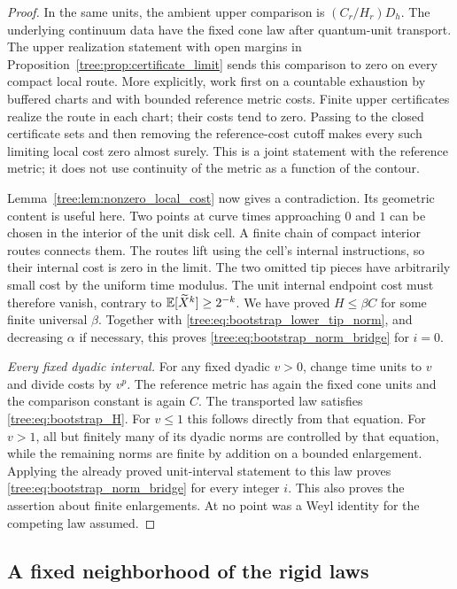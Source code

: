 \begin{proof}
In the same units, the ambient upper comparison is
$(C_r/H_r)D_h$.  The underlying continuum data have the fixed cone
law after quantum-unit transport.  The upper realization statement
with open margins in Proposition~\ref{tree:prop:certificate_limit} sends
this comparison to zero on every compact local route.  More
explicitly, work first on a countable exhaustion by buffered charts
and with bounded reference metric costs.  Finite upper certificates
realize the route in each chart; their costs tend to zero.  Passing
to the closed certificate sets and then removing the reference-cost
cutoff makes every such limiting local cost zero almost surely.
This is a joint statement with the reference metric; it does not
use continuity of the metric as a function of the contour.

Lemma~\ref{tree:lem:nonzero_local_cost} now gives a contradiction.  Its
geometric content is useful here.  Two points at curve times
approaching $0$ and $1$ can be chosen in the interior of the unit
disk cell.  A finite chain of compact interior routes connects them.
The routes lift using the cell's internal instructions, so their
internal cost is zero in the limit.  The two omitted tip pieces
have arbitrarily small cost by the uniform time modulus.  The
unit internal endpoint cost must therefore vanish, contrary to
$\mathbb E[\widetilde X^k]\geq2^{-k}$.  We have proved $H\leq\beta C$
for some finite universal $\beta$.  Together with
\eqref{tree:eq:bootstrap_lower_tip_norm}, and decreasing $\alpha$ if
necessary, this proves \eqref{tree:eq:bootstrap_norm_bridge} for $i=0$.

\smallskip\noindent\emph{Every fixed dyadic interval.}
For any fixed dyadic $v>0$, change time units to $v$ and divide
costs by $v^p$.  The reference metric has again the fixed cone
units and the comparison constant is again $C$.  The transported
law satisfies \eqref{tree:eq:bootstrap_H}.  For $v\leq1$ this follows
directly from that equation.  For $v>1$, all but finitely many of
its dyadic norms are controlled by that equation, while the
remaining norms are finite by addition on a bounded enlargement.
Applying the already proved unit-interval statement to this law
proves \eqref{tree:eq:bootstrap_norm_bridge} for every integer $i$.
This also proves the assertion about finite enlargements.  At no
point was a Weyl identity for the competing law assumed.
\end{proof}

\subsection{A fixed neighborhood of the rigid laws}

